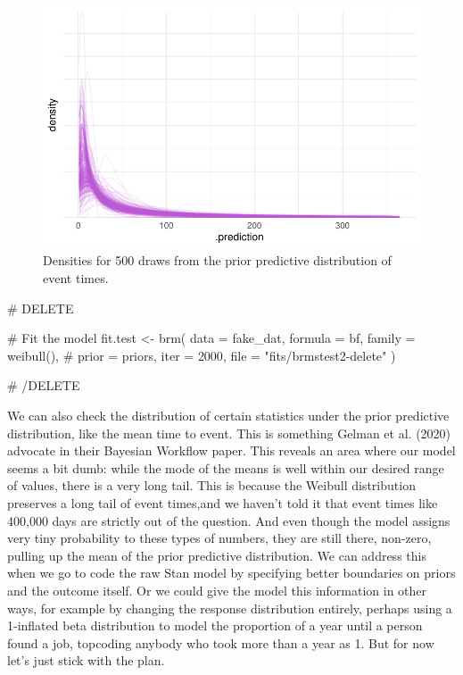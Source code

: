 \documentclass[
  letterpaper,
  DIV=11,
  numbers=noendperiod]{scrreprt}
\newenvironment{Shaded}{\begin{snugshade}}{\end{snugshade}}
\newcommand{\AttributeTok}[1]{\textcolor[rgb]{0.40,0.45,0.13}{#1}}
\newcommand{\CommentTok}[1]{\textcolor[rgb]{0.37,0.37,0.37}{#1}}
\newcommand{\DecValTok}[1]{\textcolor[rgb]{0.68,0.00,0.00}{#1}}
\newcommand{\FunctionTok}[1]{\textcolor[rgb]{0.28,0.35,0.67}{#1}}
\newcommand{\NormalTok}[1]{\textcolor[rgb]{0.00,0.23,0.31}{#1}}
\newcommand{\OtherTok}[1]{\textcolor[rgb]{0.00,0.23,0.31}{#1}}
\newcommand{\StringTok}[1]{\textcolor[rgb]{0.13,0.47,0.30}{#1}}
\begin{document}
\begin{figure}[H]

{\centering \includegraphics{./bayesian-cfa_files/figure-pdf/prior-pred-1-densities-1.pdf}

}

\caption{Densities for 500 draws from the prior predictive distribution
of event times.}

\end{figure}

\begin{Shaded}
\begin{Highlighting}[]
\CommentTok{\# DELETE}

\CommentTok{\# Fit the model}
\NormalTok{fit.test }\OtherTok{\textless{}{-}} \FunctionTok{brm}\NormalTok{(}
  \AttributeTok{data =}\NormalTok{ fake\_dat,}
  \AttributeTok{formula =}\NormalTok{ bf,}
  \AttributeTok{family =} \FunctionTok{weibull}\NormalTok{(),}
 \CommentTok{\# prior = priors,}
  \AttributeTok{iter =} \DecValTok{2000}\NormalTok{,}
  \AttributeTok{file =} \StringTok{"fits/brmstest2{-}delete"}
\NormalTok{)}



\CommentTok{\# /DELETE}
\end{Highlighting}
\end{Shaded}

We can also check the distribution of certain statistics under the prior
predictive distribution, like the mean time to event. This is something
Gelman et al. (2020) advocate in their Bayesian Workflow paper. This
reveals an area where our model seems a bit dumb: while the mode of the
means is well within our desired range of values, there is a very long
tail. This is because the Weibull distribution preserves a long tail of
event times,and we haven't told it that event times like 400,000 days
are strictly out of the question. And even though the model assigns very
tiny probability to these types of numbers, they are still there,
non-zero, pulling up the mean of the prior predictive distribution. We
can address this when we go to code the raw Stan model by specifying
better boundaries on priors and the outcome itself. Or we could give the
model this information in other ways, for example by changing the
response distribution entirely, perhaps using a 1-inflated beta
distribution to model the proportion of a year until a person found a
job, topcoding anybody who took more than a year as 1. But for now let's
just stick with the plan.
\end{document}
